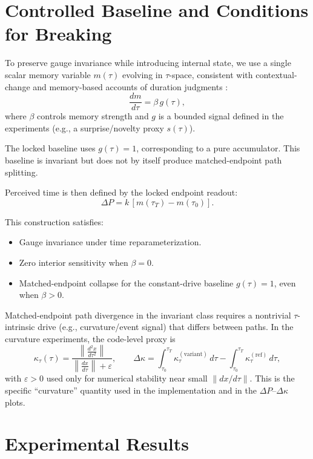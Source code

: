 \documentclass[11pt]{article}
\begin{document}
\section{Controlled Baseline and Conditions for Breaking}

To preserve gauge invariance while introducing internal state, we use a single scalar memory variable $m(\tau)$ evolving in $\tau$-space, consistent with contextual-change and memory-based accounts of duration judgments \citep{block1978remembered,block2014time}:
\[
\frac{dm}{d\tau} = \beta \, g(\tau),
\]
where $\beta$ controls memory strength and $g$ is a bounded signal defined in the experiments (e.g., a surprise/novelty proxy $s(\tau)$).

The locked baseline uses $g(\tau)=1$, corresponding to a pure accumulator. This baseline is invariant but does not by itself produce matched-endpoint path splitting.

Perceived time is then defined by the locked endpoint readout:
\[
\Delta P = k\,[m(\tau_T)-m(\tau_0)].
\]

This construction satisfies:
\begin{itemize}
\item Gauge invariance under time reparameterization.
\item Zero interior sensitivity when $\beta = 0$.
\item Matched-endpoint collapse for the constant-drive baseline $g(\tau)=1$, even when $\beta>0$.
\end{itemize}

Matched-endpoint path divergence in the invariant class requires a nontrivial $\tau$-intrinsic drive (e.g., curvature/event signal) that differs between paths.
In the curvature experiments, the code-level proxy is
\[
\kappa_\tau(\tau)=\frac{\left\|\frac{d^2 x}{d\tau^2}\right\|}{\left\|\frac{dx}{d\tau}\right\|+\varepsilon},
\qquad
\Delta\kappa=\int_{\tau_0}^{\tau_T}\kappa_\tau^{\mathrm{(variant)}}\,d\tau-\int_{\tau_0}^{\tau_T}\kappa_\tau^{\mathrm{(ref)}}\,d\tau,
\]
with $\varepsilon>0$ used only for numerical stability near small $\|dx/d\tau\|$. This is the specific ``curvature'' quantity used in the implementation and in the $\Delta P$--$\Delta\kappa$ plots.

\section{Experimental Results}


\newline
\end{document}
